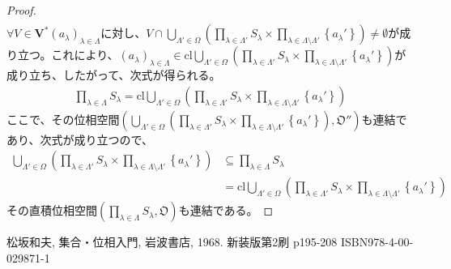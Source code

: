 \documentclass[dvipdfmx]{jsarticle}
\begin{document}
\begin{proof}
\begin{align*}
\end{align*}
$\forall V \in \mathbf{V}^{*}\left( a_{\lambda} \right)_{\lambda \in \varLambda}$に対し、$V \cap \bigcup_{\varLambda' \in \varOmega} \left( \prod_{\lambda \in \varLambda'} S_{\lambda} \times \prod_{\lambda \in \varLambda \setminus \varLambda'} \left\{ a_{\lambda}' \right\} \right) \neq \emptyset$が成り立つ。これにより、$\left( a_{\lambda} \right)_{\lambda \in \varLambda} \in {\mathrm{cl}}{\bigcup_{\varLambda' \in \varOmega} \left( \prod_{\lambda \in \varLambda'} S_{\lambda} \times \prod_{\lambda \in \varLambda \setminus \varLambda'} \left\{ a_{\lambda}' \right\} \right)}$が成り立ち、したがって、次式が得られる。
\begin{align*}
\prod_{\lambda \in \varLambda} S_{\lambda} = {\mathrm{cl}}{\bigcup_{\varLambda' \in \varOmega} \left( \prod_{\lambda \in \varLambda'} S_{\lambda} \times \prod_{\lambda \in \varLambda \setminus \varLambda'} \left\{ a_{\lambda}' \right\} \right)}
\end{align*}
ここで、その位相空間$\left( \bigcup_{\varLambda' \in \varOmega} \left( \prod_{\lambda \in \varLambda'} S_{\lambda} \times \prod_{\lambda \in \varLambda \setminus \varLambda'} \left\{ a_{\lambda}' \right\} \right),\mathfrak{O}'' \right)$も連結であり、次式が成り立つので、
\begin{align*}
\bigcup_{\varLambda' \in \varOmega} \left( \prod_{\lambda \in \varLambda'} S_{\lambda} \times \prod_{\lambda \in \varLambda \setminus \varLambda'} \left\{ a_{\lambda}' \right\} \right) &\subseteq \prod_{\lambda \in \varLambda} S_{\lambda}\\
&= {\mathrm{cl}}{\bigcup_{\varLambda' \in \varOmega} \left( \prod_{\lambda \in \varLambda'} S_{\lambda} \times \prod_{\lambda \in \varLambda \setminus \varLambda'} \left\{ a_{\lambda}' \right\} \right)}
\end{align*}
その直積位相空間$\left( \prod_{\lambda \in \varLambda} S_{\lambda},\mathfrak{O} \right)$も連結である。
\end{proof}
\begin{thebibliography}{50}
  松坂和夫, 集合・位相入門, 岩波書店, 1968. 新装版第2刷 p195-208 ISBN978-4-00-029871-1
\end{thebibliography}
\end{document}
